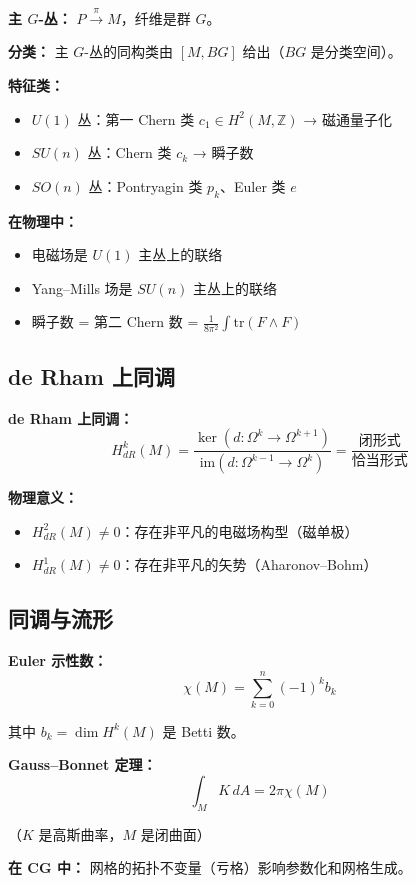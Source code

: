 \textbf{主 $G$-丛：} $P \xrightarrow{\pi} M$，纤维是群 $G$。

\textbf{分类：} 主 $G$-丛的同构类由 $[M, BG]$ 给出（$BG$ 是分类空间）。

\textbf{特征类：}
\begin{itemize}
  \item $U(1)$ 丛：第一 Chern 类 $c_1 \in H^2(M, \mathbb{Z})$ → 磁通量子化
  \item $SU(n)$ 丛：Chern 类 $c_k$ → 瞬子数
  \item $SO(n)$ 丛：Pontryagin 类 $p_k$、Euler 类 $e$
\end{itemize}

\textbf{在物理中：}
\begin{itemize}
  \item 电磁场是 $U(1)$ 主丛上的联络
  \item Yang--Mills 场是 $SU(n)$ 主丛上的联络
  \item 瞬子数 = 第二 Chern 数 = $\frac{1}{8\pi^2}\int \text{tr}(F \wedge F)$
\end{itemize}

\subsection{de Rham 上同调}

\textbf{de Rham 上同调：}
\[
H^k_{dR}(M) = \frac{\ker(d: \Omega^k \to \Omega^{k+1})}{\text{im}(d: \Omega^{k-1} \to \Omega^k)} = \frac{\text{闭形式}}{\text{恰当形式}}
\]

\textbf{物理意义：}
\begin{itemize}
  \item $H^2_{dR}(M) \neq 0$：存在非平凡的电磁场构型（磁单极）
  \item $H^1_{dR}(M) \neq 0$：存在非平凡的矢势（Aharonov--Bohm）
\end{itemize}

\subsection{同调与流形}

\textbf{Euler 示性数：}
\[
\chi(M) = \sum_{k=0}^n (-1)^k b_k
\]

其中 $b_k = \dim H^k(M)$ 是 Betti 数。

\textbf{Gauss--Bonnet 定理：}
\[
\int_M K\,dA = 2\pi\chi(M)
\]

（$K$ 是高斯曲率，$M$ 是闭曲面）

\textbf{在 CG 中：} 网格的拓扑不变量（亏格）影响参数化和网格生成。